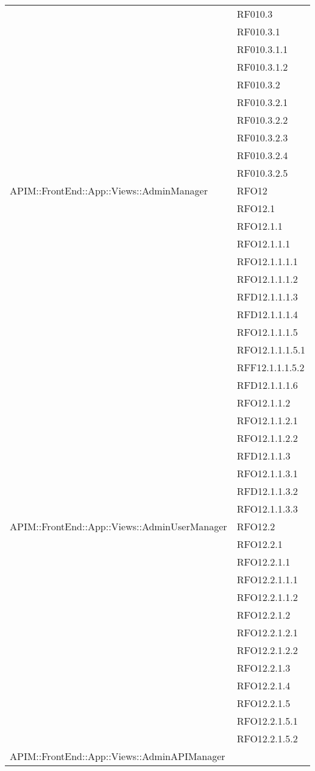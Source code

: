\begin{longtable}{ p{12cm} | p{4cm} }
	& RF010.3 \\
	& RF010.3.1 \\
	& RF010.3.1.1 \\
	& RF010.3.1.2 \\
	& RF010.3.2 \\
	& RF010.3.2.1 \\
	& RF010.3.2.2 \\
	& RF010.3.2.3 \\
	& RF010.3.2.4 \\
	& RF010.3.2.5 \\
	\hline
	APIM::FrontEnd::App::Views::AdminManager
	& RFO12 \\
	& RFO12.1 \\
	& RFO12.1.1 \\
	& RFO12.1.1.1 \\
	& RFO12.1.1.1.1 \\
	& RFO12.1.1.1.2 \\
	& RFD12.1.1.1.3 \\
	& RFD12.1.1.1.4 \\
	& RFO12.1.1.1.5 \\
	& RFO12.1.1.1.5.1 \\
	& RFF12.1.1.1.5.2 \\
	& RFD12.1.1.1.6 \\
	& RFO12.1.1.2 \\
	& RFO12.1.1.2.1 \\
	& RFO12.1.1.2.2 \\
	& RFD12.1.1.3 \\
	& RFO12.1.1.3.1 \\
	& RFD12.1.1.3.2 \\
	& RFO12.1.1.3.3 \\
	\hline
	APIM::FrontEnd::App::Views::AdminUserManager
	& RFO12.2 \\
	& RFO12.2.1 \\
	& RFO12.2.1.1 \\
	& RFO12.2.1.1.1 \\
	& RFO12.2.1.1.2 \\
	& RFO12.2.1.2 \\
	& RFO12.2.1.2.1 \\
	& RFO12.2.1.2.2 \\
	& RFO12.2.1.3 \\
	& RFO12.2.1.4 \\
	& RFO12.2.1.5 \\
	& RFO12.2.1.5.1 \\
	& RFO12.2.1.5.2 \\
	\hline
	APIM::FrontEnd::App::Views::AdminAPIManager

\end{longtable}
